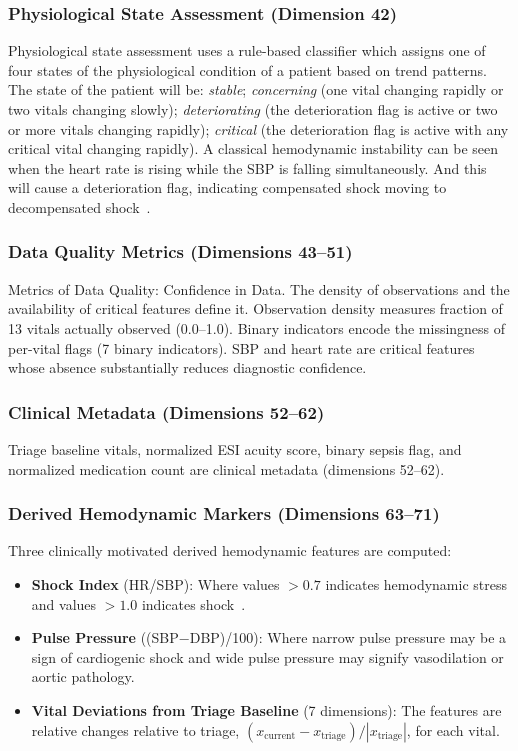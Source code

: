 \documentclass[runningheads]{llncs}
\begin{document}
\subsubsection{Physiological State Assessment (Dimension 42)}
Physiological state assessment uses a rule-based classifier which assigns one of four states of the physiological condition of a patient based on trend patterns. The state of the patient will be: \textit{stable}; \textit{concerning} (one vital changing rapidly or two vitals changing slowly); \textit{deteriorating} (the deterioration flag is active or two or more vitals changing rapidly); \textit{critical} (the deterioration flag is active with any critical vital changing rapidly). A classical hemodynamic instability can be seen when the heart rate is rising while the SBP is falling simultaneously. And this will cause a deterioration flag, indicating compensated shock moving to decompensated shock~\cite{Hoot2008}.

\subsubsection{Data Quality Metrics (Dimensions 43--51)}
Metrics of Data Quality: Confidence in Data. The density of observations and the availability of critical features define it. Observation density measures fraction of 13 vitals actually observed (0.0--1.0). Binary indicators encode the missingness of per-vital flags (7 binary indicators). SBP and heart rate are critical features whose absence substantially reduces diagnostic confidence.

\subsubsection{Clinical Metadata (Dimensions 52--62)}
Triage baseline vitals, normalized ESI acuity score, binary sepsis flag, and normalized medication count are clinical metadata (dimensions 52--62).

\subsubsection{Derived Hemodynamic Markers (Dimensions 63--71)}
Three clinically motivated derived hemodynamic features are computed:
\begin{itemize}
    \item \textbf{Shock Index} (HR/SBP): Where values $>0.7$ indicates hemodynamic stress and values $>1.0$ indicates shock~\cite{Koch2019}.
    \item \textbf{Pulse Pressure} ((SBP$-$DBP)/100): Where narrow pulse pressure may be a sign of cardiogenic shock and wide pulse pressure may signify vasodilation or aortic pathology.
    \item \textbf{Vital Deviations from Triage Baseline} (7 dimensions): The features are relative changes relative to triage, $(x_{\text{current}} - x_{\text{triage}}) / |x_{\text{triage}}|$, for each vital.
\end{itemize}
\end{document}
